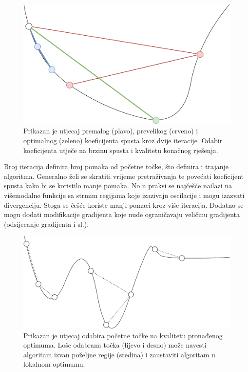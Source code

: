 \documentclass[times, utf8, numeric, diplomski]{fer}
\begin{document}
\begin{figure}[H]
\centering
\includegraphics[scale=0.4]{grad_descent_rate.pdf}
\caption{Prikazan je utjecaj premalog (plavo), prevelikog (crveno) i optimalnog (zeleno) koeficijenta spusta kroz dvije iteracije. Odabir koeficijenta utječe na brzinu spusta i kvalitetu konačnog rješenja.}
\label{fig:oscilira_divergira}
\end{figure}

Broj iteracija definira broj pomaka od početne točke, što definira i trajanje algoritma. Generalno želi se skratiti vrijeme pretraživanja te povećati koeficijent spusta kako bi se koristilo manje pomaka. No u praksi se najčešće nailazi na višemodalne funkcije sa strmim regijama koje izazivaju oscilacije i mogu izazvati divergenciju. Stoga se češće koriste manji pomaci kroz više iteracija. Dodatno se mogu dodati modifikacije gradijenta koje nude ograničavaju veličinu gradijenta (odsijecanje gradijenta i sl.).

\begin{figure}[H]
\centering
\includegraphics[scale=0.5]{grad_descent_start.pdf}
\caption{Prikazan je utjecaj odabira početne točke na kvalitetu pronađenog optimuma. Loše odabrana točka (lijevo i desno) može navesti algoritam izvan poželjne regije (sredina) i zaustaviti algoritam u lokalnom optimumu.}
\label{fig:pocetna_tocka}
\end{figure}
\end{document}
